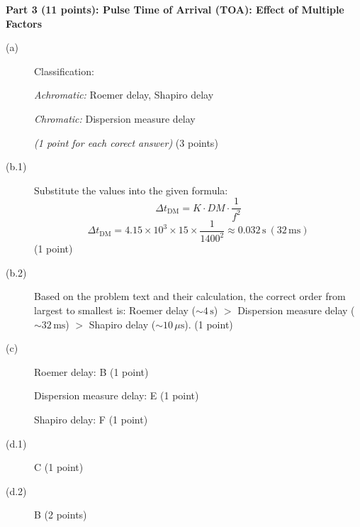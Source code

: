 \medskip\noindent\textbf{Part 3 (11 points): Pulse Time of Arrival (TOA): Effect of Multiple Factors}

\begin{description}
\item[(a)] Classification:

  \emph{Achromatic:} Roemer delay, Shapiro delay

  \emph{Chromatic:} Dispersion measure delay

  \emph{(1 point for each corect answer)} \hfill(3 points)

\item[(b.1)] Substitute the values into the given formula:
  \[
  \Delta t_{\mathrm{DM}} = K \cdot DM \cdot \frac{1}{f^2}
  \]
  \[
  \Delta t_{\mathrm{DM}} = 4.15 \times 10^3 \times 15 \times \frac{1}{1400^2}
    \approx 0.032\,\mathrm{s}\ (32\,\mathrm{ms})
  \]
  \hfill(1 point)

\item[(b.2)] Based on the problem text and their calculation, the correct
  order from largest to smallest is: Roemer delay ($\sim 4\,\mathrm{s}$)
  $>$ Dispersion measure delay ($\sim 32\,\mathrm{ms}$) $>$ Shapiro delay
  ($\sim 10\,\mu\mathrm{s}$). \hfill(1 point)

\item[(c)] Roemer delay: B \hfill(1 point)

  Dispersion measure delay: E \hfill(1 point)

  Shapiro delay: F \hfill(1 point)

\item[(d.1)] C \hfill(1 point)

\item[(d.2)] B \hfill(2 points)
\end{description}


